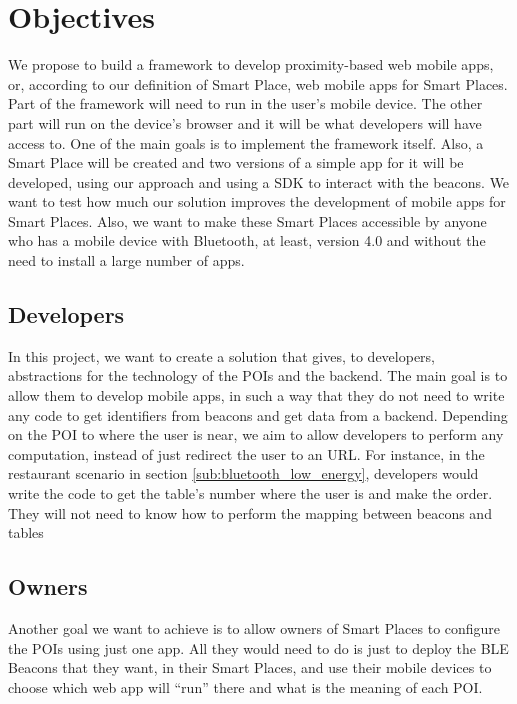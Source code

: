 
% 
% 

\section{Objectives}
\label{sec:objectives}

We propose
to build a framework to develop proximity-based web mobile
apps, or, according to our definition of Smart Place, web
mobile apps for Smart Places.
Part of the framework will need to run in the user's 
mobile device.
The other part will run on the device's browser and
it will be what developers will have access to.
One of the main goals is to implement the framework itself.
Also, a Smart Place will be created and 
two versions of a simple
app for it will be developed, using our approach and using a SDK to interact with the beacons.
We want to test how much our solution improves the
development of mobile apps for Smart Places.
Also, we want to make these Smart Places accessible by 
anyone who has a mobile device with Bluetooth, at least,
version 4.0 and without the need to install a large number
of apps.

\subsection{Developers}
\label{sub:developers}
In this project, we want to create a solution that
gives, to developers, abstractions for the technology
of the POIs and the backend. The main goal is
to allow them to develop mobile apps, in such a way
that they do not need to write any code to get
identifiers from beacons and get data from a backend.
Depending on the POI to where the user is near, 
we aim to allow developers to perform any computation,
instead of just redirect the user to an URL.
For instance, in the restaurant scenario in section
\ref{sub:bluetooth_low_energy}, developers would
write the code to get the table's number where the
user is and make the order. They will not need
to know how to perform the mapping between beacons
and tables

\subsection{Owners}
\label{sub:owners}
Another goal we want to achieve is to allow owners of
Smart Places to configure the POIs using just one app.
All they would need to do is just to deploy the BLE Beacons
that they want, in their Smart Places, and use their
mobile devices
to choose which web app will ``run'' there and what 
is the meaning of each POI.

